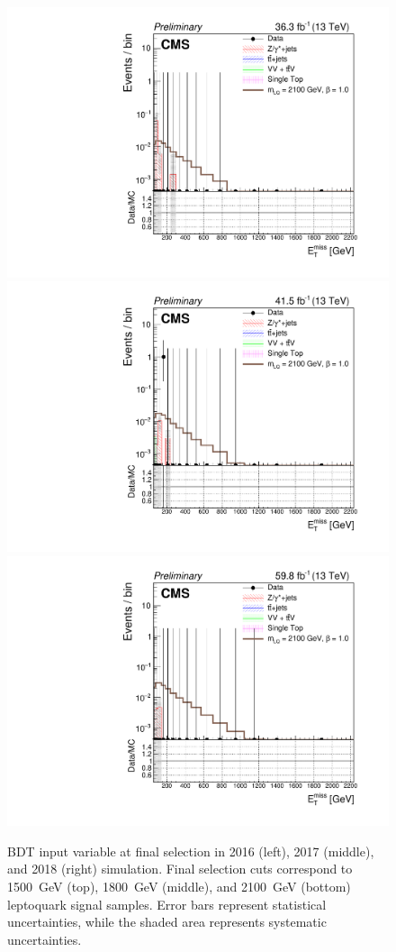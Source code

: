 \begin{figure}[H]
    {\includegraphics[width=.32\textwidth]{Images/Analysis/Results_2016_Unblinded/Plots/Final_selection/BasicLQ_uujj_Pt_miss_final2100.pdf}}
    {\includegraphics[width=.32\textwidth]{Images/Analysis/Results_2017_Unblinded/Plots/Final_selection/BasicLQ_uujj_Pt_miss_final2100.pdf}}
    {\includegraphics[width=.32\textwidth]{Images/Analysis/Results_2018_Unblinded/Plots/Final_selection/BasicLQ_uujj_Pt_miss_final2100.pdf}}
    \caption{BDT input variable \ptmiss at final selection in 2016 (left), 2017 (middle), and 2018 (right) simulation. Final selection cuts correspond to \SI{1500}{GeV} (top), \SI{1800}{GeV} (middle), and \SI{2100}{GeV} (bottom) leptoquark signal samples. Error bars represent statistical uncertainties, while the shaded area represents systematic uncertainties.
    \label{figapp:finalSelMET}}
\end{figure}
